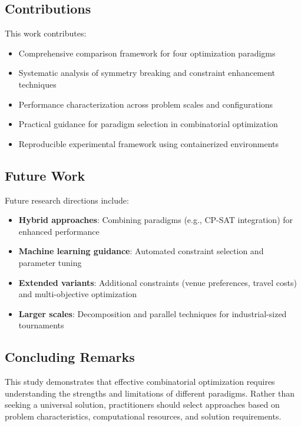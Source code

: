 \documentclass[11pt]{article}
\begin{document}
\begin{itemize}
\subsection{Contributions}

This work contributes:
\begin{itemize}
    \item Comprehensive comparison framework for four optimization paradigms
    \item Systematic analysis of symmetry breaking and constraint enhancement techniques
    \item Performance characterization across problem scales and configurations
    \item Practical guidance for paradigm selection in combinatorial optimization
    \item Reproducible experimental framework using containerized environments
\end{itemize}

\subsection{Future Work}

Future research directions include:
\begin{itemize}
    \item \textbf{Hybrid approaches}: Combining paradigms (e.g., CP-SAT integration) for enhanced performance
    \item \textbf{Machine learning guidance}: Automated constraint selection and parameter tuning
    \item \textbf{Extended variants}: Additional constraints (venue preferences, travel costs) and multi-objective optimization
    \item \textbf{Larger scales}: Decomposition and parallel techniques for industrial-sized tournaments
\end{itemize}

\subsection{Concluding Remarks}

This study demonstrates that effective combinatorial optimization requires understanding the strengths and limitations of different paradigms. Rather than seeking a universal solution, practitioners should select approaches based on problem characteristics, computational resources, and solution requirements.


\end{itemize}
\end{document}
